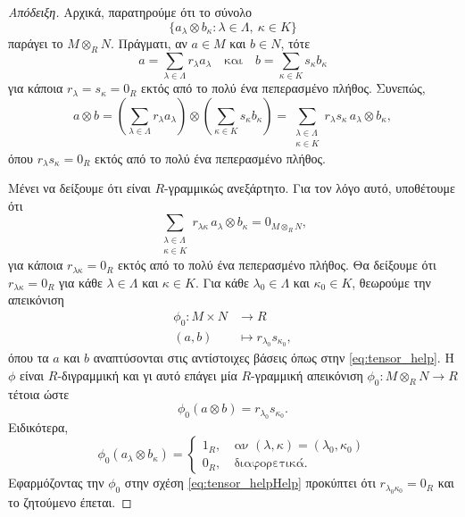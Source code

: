 \documentclass[12pt,a4paper,reqno]{amsart}
\theoremstyle{definition}
\theoremstyle{remark}
\numberwithin{theorem}{section}
\numberwithin{exercise}{section}
\numberwithin{equation}{section}
\renewcommand{\to}{\rightarrow}
\begin{document}
\begin{proof}[Απόδειξη]
    Αρχικά, παρατηρούμε ότι το σύνολο 
    \[
    \{a_\lambda \otimes b_\kappa : \lambda \in \Lambda, \ \kappa \in K\}
    \]
    παράγει το $M \otimes_R N$. Πράγματι, αν $a \in M$ και $b \in N$, τότε 
    \begin{equation}
        \label{eq:tensor_help}
        a = \sum_{\lambda \in \Lambda} r_\lambda a_\lambda \quad \text{και} \quad 
        b = \sum_{\kappa \in K} s_\kappa b_\kappa
    \end{equation}
    για κάποια $r_\lambda = s_\kappa = 0_R$ εκτός από το πολύ ένα πεπερασμένο πλήθος. Συνεπώς, 
    \[
    a \otimes b = \left(
        \sum_{\lambda \in \Lambda} r_\lambda a_\lambda
    \right) \otimes 
    \left(
        \sum_{\kappa \in K} s_\kappa b_\kappa
    \right) = \sum_{\substack{\lambda \in \Lambda \\ \kappa \in K}} r_\lambda s_\kappa \, a_\lambda \otimes b_\kappa,
    \]
    όπου $r_\lambda s_\kappa = 0_R$ εκτός από το πολύ ένα πεπερασμένο πλήθος.

    Μένει να δείξουμε ότι είναι $R$-γραμμικώς ανεξάρτητο. Για τον λόγο αυτό, υποθέτουμε ότι 
    \begin{equation}
        \label{eq:tensor_helpHelp}
        \sum_{\substack{\lambda \in \Lambda \\ \kappa \in K}} r_{\lambda\kappa} \, a_\lambda \otimes b_\kappa = 0_{M\otimes_R{N}},
    \end{equation}
    για κάποια $r_{\lambda\kappa} = 0_R$ εκτός από το πολύ ένα πεπερασμένο πλήθος. Θα δείξουμε ότι $r_{\lambda\kappa} = 0_R$ για κάθε $\lambda \in \Lambda$ και $\kappa \in K$. Για κάθε $\lambda_0 \in \Lambda$ και $\kappa_0 \in K$, θεωρούμε την απεικόνιση 
    \begin{align*}
        \phi_0 : M \times N &\to R \\
        (a, b) &\mapsto r_{\lambda_0} s_{\kappa_0},
    \end{align*}
    όπου τα $a$ και $b$ αναπτύσονται στις αντίστοιχες βάσεις όπως στην \eqref{eq:tensor_help}. Η $\phi$ είναι $R$-διγραμμική και γι αυτό επάγει μία $R$-γραμμική απεικόνιση $\phi_0 : M \otimes_R N \to R$ τέτοια ώστε 
    \[
    \phi_0(a\otimes{b}) = r_{\lambda_0} s_{\kappa_0}.
    \]
    Ειδικότερα, 
    \[
    \phi_0(a_\lambda \otimes b_\kappa) = 
    \begin{cases}
        1_R, &\ \text{αν $(\lambda,\kappa) = (\lambda_0,\kappa_0)$} \\
        0_R, &\ \text{διαφορετικά}.
    \end{cases}
    \]
    Εφαρμόζοντας την $\phi_0$ στην σχέση \eqref{eq:tensor_helpHelp} προκύπτει ότι $r_{\lambda_0\kappa_0} = 0_R$ και το ζητούμενο έπεται.
\end{proof}
\end{document}
